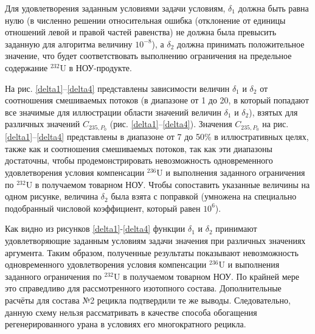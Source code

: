 Для удовлетворения заданным условиями задачи условиям, $\delta_1$ должна быть равна нулю (в численно решении относительная ошибка (отклонение от единицы отношений левой и правой частей равенства) не должна была превысить заданную для алгоритма величину $10^{-8}$), а $\delta_2$ должна принимать положительное значение, что будет соответствовать выполнению ограничения на предельное содержание $^{232}$U в НОУ-продукте.

На рис. \ref{delta1}--\ref{delta4} представлены зависимости величин $\delta_1$ и $\delta_2$ от соотношения смешиваемых потоков (в диапазоне от 1 до 20, в который попадают все значимые для иллюстрации области значений величин $\delta_1$ и $\delta_2$), взятых для различных значений $C_{235, P_0}$ (рис. \ref{delta1}--\ref{delta4}). Значения $C_{235, P_0}$ на рис. \ref{delta1}--\ref{delta4} представлены в диапазоне от 7 до 50\% в иллюстративных целях,  также как и соотношения смешиваемых потоков, так как эти диапазоны достаточны, чтобы продемонстрировать невозможность одновременного удовлетворения условия компенсации $^{236}$U и выполнения заданного ограничения по $^{232}$U в получаемом товарном НОУ. Чтобы сопоставить указанные величины на одном рисунке, величина $\delta_2$ была взята с поправкой (умножена на специально подобранный числовой коэффициент, который равен $10^{6}$).

Как видно из рисунков \ref{delta1}-\ref{delta4} функции $\delta_1$ и $\delta_2$ принимают удовлетворяющие заданным условиям задачи значения при различных значениях аргумента. Таким образом, полученные результаты показывают невозможность одновременного удовлетворения условия компенсации $^{236}$U и выполнения заданного ограничения по $^{232}$U в получаемом товарном НОУ. По крайней мере это справедливо для рассмотренного изотопного состава. Дополнительные расчёты для состава №2 рецикла подтвердили те же выводы. Следовательно, данную схему нельзя рассматривать в качестве способа обогащения регенерированного урана в условиях его многократного рецикла.


